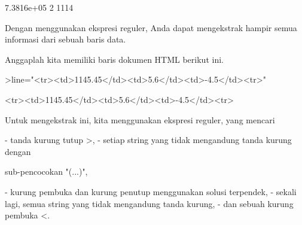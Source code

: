 \documentclass[12pt,Times new roman,letterpaper]{book}
\begin{document}
\begin{eulernootebook}
\begin{eulercomment}
\begin{eulercomment}
\begin{eulernootebook}
\begin{eulercomment}
\begin{eulercomment}
\begin{eulercomment}
\begin{eulercomment}
\begin{eulercomment}
\begin{eulercomment}
\begin{eulercomment}
\begin{eulercomment}
\begin{eulercomment}
\begin{eulercomment}
\begin{eulercomment}
\begin{eulercomment}
\begin{eulercomment}
\begin{eulerprompt}
\end{eulerprompt}
\begin{euleroutput}
  7.3816e+05
  2
  1114
\end{euleroutput}
\begin{eulercomment}
Dengan menggunakan ekspresi reguler, Anda dapat mengekstrak hampir
semua informasi dari sebuah baris data.

Anggaplah kita memiliki baris dokumen HTML berikut ini.
\end{eulercomment}
\begin{eulerprompt}
>line="<tr><td>1145.45</td><td>5.6</td><td>-4.5</td><tr>"
\end{eulerprompt}
\begin{euleroutput}
  <tr><td>1145.45</td><td>5.6</td><td>-4.5</td><tr>
\end{euleroutput}
\begin{eulercomment}
Untuk mengekstrak ini, kita menggunakan ekspresi reguler, yang mencari

\end{eulercomment}
\begin{eulerttcomment}
 - tanda kurung tutup >,
 - setiap string yang tidak mengandung tanda kurung dengan
\end{eulerttcomment}
\begin{eulercomment}
sub-pencocokan "(...)",\\
\end{eulercomment}
\begin{eulerttcomment}
 - kurung pembuka dan kurung penutup menggunakan solusi terpendek,
 - sekali lagi, semua string yang tidak mengandung tanda kurung,
 - dan sebuah kurung pembuka <.
\end{eulerttcomment}
\begin{eulercomment}


\end{eulercomment}
\end{eulercomment}
\end{eulercomment}
\end{eulercomment}
\end{eulercomment}
\end{eulercomment}
\end{eulercomment}
\end{eulercomment}
\end{eulercomment}
\end{eulercomment}
\end{eulercomment}
\end{eulercomment}
\end{eulercomment}
\end{eulercomment}
\end{eulernootebook}
\end{eulercomment}
\end{eulercomment}
\end{eulernootebook}
\end{document}
